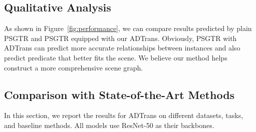 \documentclass[letterpaper]{article} %
\begin{document}
\subsection{Qualitative Analysis}
As shown in Figure~\ref{fig:performance}, we can compare results predicted by plain PSGTR and PSGTR equipped with our ADTrans. Obviously, PSGTR with ADTrans can predict more accurate relationships between instances and also predict predicate that better fits the scene. 
We believe our method helps construct a more comprehensive scene graph.


\subsection{Comparison with State-of-the-Art Methods}
In this section, we report the results for ADTrans on different datasets, tasks, and baseline methods. All models use ResNet-50 \cite{He_2016_CVPR} as their backbones.

\end{document}
